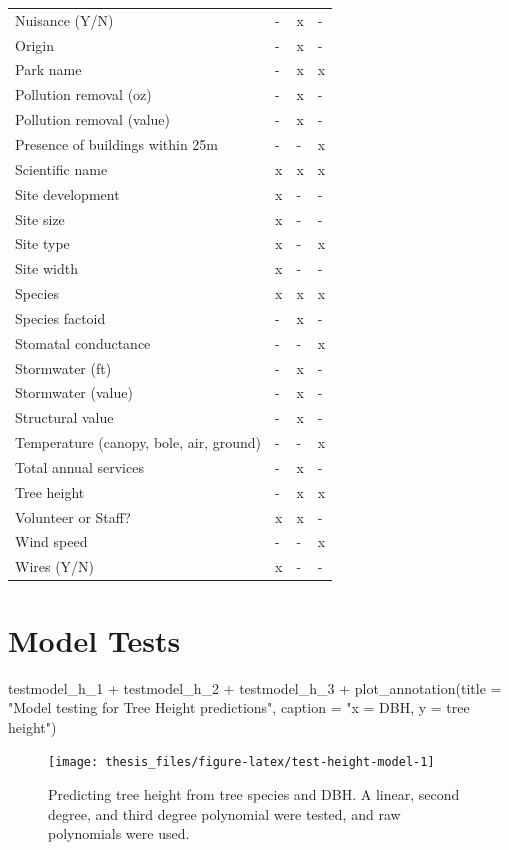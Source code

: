 \documentclass[12pt,twoside]{reedthesis}
\newenvironment{Shaded}{\begin{snugshade}}{\end{snugshade}}
\newcommand{\AttributeTok}[1]{\textcolor[rgb]{0.77,0.63,0.00}{#1}}
\newcommand{\FunctionTok}[1]{\textcolor[rgb]{0.00,0.00,0.00}{#1}}
\newcommand{\NormalTok}[1]{#1}
\newcommand{\SpecialCharTok}[1]{\textcolor[rgb]{0.00,0.00,0.00}{#1}}
\newcommand{\StringTok}[1]{\textcolor[rgb]{0.31,0.60,0.02}{#1}}
\begin{document}
\begin{longtable}[t]{llll}
Nuisance (Y/N) & - & x & -\\
\addlinespace
Origin & - & x & -\\
Park name & - & x & x\\
Pollution removal (oz) & - & x & -\\
Pollution removal (value) & - & x & -\\
Presence of buildings within 25m & - & - & x\\
\addlinespace
Scientific name & x & x & x\\
Site development & x & - & -\\
Site size & x & - & -\\
Site type & x & - & x\\
Site width & x & - & -\\
\addlinespace
Species & x & x & x\\
Species factoid & - & x & -\\
Stomatal conductance & - & - & x\\
Stormwater (ft) & - & x & -\\
Stormwater (value) & - & x & -\\
\addlinespace
Structural value & - & x & -\\
Temperature (canopy, bole, air, ground) & - & - & x\\
Total annual services & - & x & -\\
Tree height & - & x & x\\
Volunteer or Staff? & x & x & -\\
\addlinespace
Wind speed & - & - & x\\
Wires (Y/N) & x & - & -\\
\bottomrule
\end{longtable}
\hypertarget{model-tests}{%
\section{Model Tests}\label{model-tests}}
\begin{Shaded}
\begin{Highlighting}[]
\NormalTok{testmodel\_h\_1 }\SpecialCharTok{+}\NormalTok{ testmodel\_h\_2 }\SpecialCharTok{+}\NormalTok{ testmodel\_h\_3 }\SpecialCharTok{+} \FunctionTok{plot\_annotation}\NormalTok{(}\AttributeTok{title =} \StringTok{"Model testing for Tree Height predictions"}\NormalTok{,}
    \AttributeTok{caption =} \StringTok{"x = DBH, y = tree height"}\NormalTok{)}
\end{Highlighting}
\end{Shaded}
\begin{figure}

{\centering \texttt{[image: thesis\_files/figure-latex/test-height-model-1]} 

}

\caption[Model tests for tree height predictions]{Predicting tree height from tree species and DBH. A linear, second degree, and third degree polynomial were tested, and raw polynomials were used.}\label{fig:test-height-model}
\end{figure}
\end{document}
